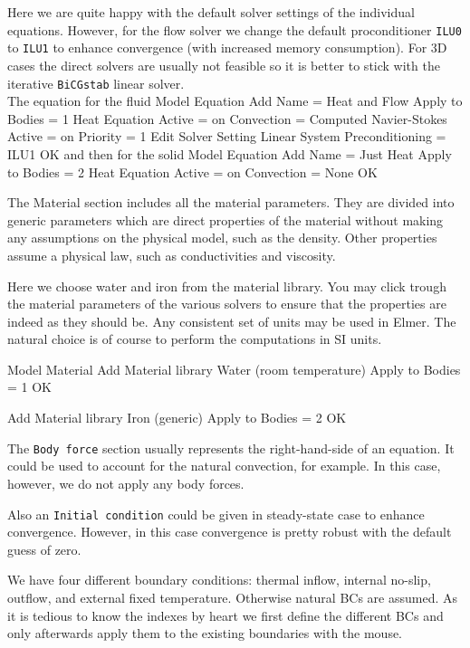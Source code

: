 Here we are quite happy with the default solver settings of the individual equations. 
However, for the flow solver we change the default proconditioner \texttt{ILU0} to \texttt{ILU1} to 
enhance convergence (with increased memory consumption). For 3D cases the direct solvers are usually 
not feasible so it is better to stick with the iterative \texttt{BiCGstab} linear solver. 
\\
The equation for the fluid
\ttbegin
Model
  Equation
    Add
    Name = Heat and Flow
    Apply to Bodies = 1
    Heat Equation
      Active = on
      Convection = Computed
    Navier-Stokes 
      Active = on
      Priority = 1
      Edit Solver Setting
        Linear System
          Preconditioning = ILU1
    OK
\ttend        
and then for the solid
\ttbegin
Model
  Equation
    Add
    Name = Just Heat
    Apply to Bodies = 2
    Heat Equation
      Active = on
      Convection = None
    OK
\ttend    


The Material section includes all the material parameters.
They are divided into generic parameters which are direct properties of the material
without making any assumptions on the physical model, such as the density. Other properties assume
a physical law, such as conductivities and viscosity. 

Here we choose water and iron from the material library.
You may click trough the material parameters of the various solvers to ensure that
the properties are indeed as they should be. Any consistent set of units may be used in Elmer.
The natural choice is of course to perform the computations in SI units. 

\ttbegin
Model
  Material
    Add
    Material library    
      Water (room temperature)
    Apply to Bodies = 1 
    OK

    Add
    Material library    
      Iron (generic)
    Apply to Bodies = 2
    OK
\ttend

The \texttt{Body force} section usually represents the right-hand-side of an equation. It could be used to account for the 
natural convection, for example. In this case, however, we do not apply any body forces.

Also an \texttt{Initial condition} could be given in steady-state case to enhance convergence. However, 
in this case convergence is pretty robust with the default guess of zero.

We have four different boundary conditions: thermal inflow, internal no-slip, 
outflow, and external fixed temperature. Otherwise natural BCs are assumed.
As it is tedious to know the indexes by heart we 
first define the different BCs and only afterwards apply them to the existing boundaries 
with the mouse. 

